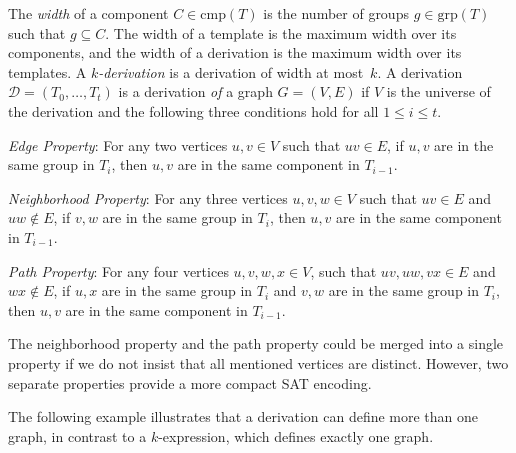 \documentclass[10pt,usletter]{article}
\theoremstyle{remark}
\newcommand{\DDD}{\mathcal{D}}
\newcommand{\hy}{\hbox{-}\nobreak\hskip0pt}
\newcommand{\comps}{\text{cmp}}
\newcommand{\groups}{\text{grp}}
\begin{document}
The \emph{width} of a component $C\in \comps(T)$ is the number of
groups $g\in \groups(T)$ such that \mbox{$g\subseteq C$}.  The width
of a template is the maximum width over its components, and the width
of a derivation is the maximum width over its templates.  A
\emph{$k$\hy derivation} is a derivation of width at most~$k$.
A derivation $\DDD=(T_0,\dots,T_t)$ is a derivation \emph{of} a
graph $G=(V,E)$ if $V$ is the universe of the derivation and the
following three conditions hold for all $1\leq i \leq t$.
\begin{description}
\item{\emph{Edge Property}:} For any two vertices $u,v\in V$ such that
  $uv\in E$, if $u,v$ are in the same group in $T_i$, then $u,v$
  are in the same component in $T_{i-1}$.
\item{\emph{Neighborhood Property}:} For any three vertices $u,v,w\in V$
  such that $uv\in E$ and $uw\notin E$, if $v,w$ are in the same group
  in $T_i$, then $u,v$ are in the same component in $T_{i-1}$.
\item{\emph{Path Property}:} For any four vertices $u,v,w,x\in V$,
  such that $uv, uw, vx \in E$ and $wx \notin E$, if $u,x$ are in the
  same group in $T_i$ and $v,w$ are in the same group in $T_i$, then
  $u,v$ are in the same component in $T_{i-1}$.
\end{description}
The neighborhood property and the path
property could be merged into a single property if we do not insist that
all mentioned vertices are distinct. However, two separate properties
provide a more compact SAT encoding.

The following example illustrates that a derivation can define more
than one graph, in contrast to a $k$\hy expression, which defines
exactly one graph.
\end{document}
